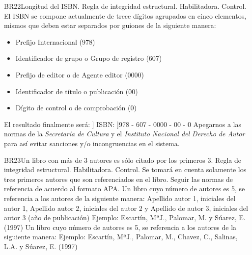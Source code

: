 \begin{BussinesRule}{BR22}{Longitud del ISBN.}
    \BRitem[Tipo:] Regla de integridad estructural.
    \BRitem[Clase:] Habilitadora.
    \BRitem[Nivel:] Control.
    \BRitem[Descripción:] El ISBN se compone actualmente de trece dígitos agrupados en cinco elementos, mismos que deben estar separados por guiones de la siguiente manera:
    \begin{itemize}
        \item Prefijo Internacional (978)
        \item Identificador de grupo o Grupo de registro (607)
        \item Prefijo de editor o de Agente editor (0000)
        \item Identificador de título o publicación (00)
        \item Dígito de control o de comprobación (0)
    \end{itemize}
El resultado finalmente será: ] ISBN: ]978 - 607 - 0000 - 00 - 0
    \BRitem[Sentencia:]
    \BRitem[Motivación:] Apegarnos a las normas de la \emph{Secretaría de Cultura} y el \emph{Instituto Nacional del Derecho de Autor} para así evitar sanciones y/o incongruencias en el sistema.
\end{BussinesRule}
\begin{BussinesRule}{BR23}{Un libro con más de 3 autores es sólo citado por los primeros 3.}
    \BRitem[Tipo:] Regla de integridad estructural.
    \BRitem[Clase:] Habilitadora.
    \BRitem[Nivel:] Control.
    \BRitem[Descripción:] Se tomará en cuenta solamente los tres primeros autores que son referenciados en el libro.
    \BRitem[Motivación:] Seguir las normas de referencia de acuerdo al formato APA.
     Un libro cuyo número de autores es 5, se referencia a los autores de la siguiente manera:
    Apellido autor 1, iniciales del autor 1, Apellido autor 2, iniciales del autor 2 y Apellido de autor 3, iniciales del autor 3 (año de publicación)
    Ejemplo: Escartín, MªJ., Palomar, M. y Súarez, E. (1997)
     Un libro cuyo número de autores es 5, se referencia a los autores de la siguiente manera:
    Ejemplo: Escartín, MªJ., Palomar, M., Chavez, C., Salinas, L.A. y Súarez, E. (1997)
\end{BussinesRule}
